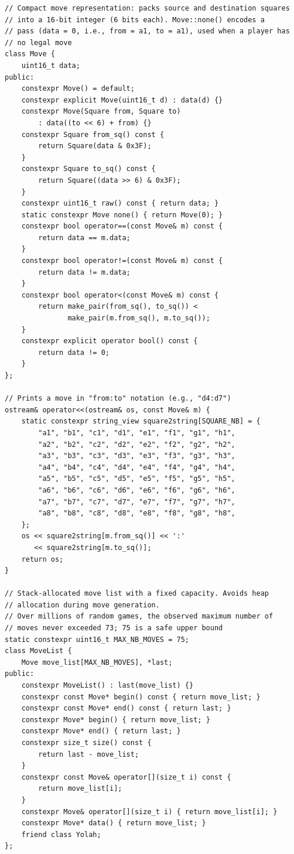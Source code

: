 \documentclass[12pt,a4paper,twoside,openright]{book}
\begin{document}
\begin{mdframed}[skipabove=\baselineskip,topline=false,rightline=false,bottomline=false,leftline=false,linewidth=1pt,linecolor=gray!40,innerleftmargin=8pt]
\begin{verbatim}
// Compact move representation: packs source and destination squares 
// into a 16-bit integer (6 bits each). Move::none() encodes a 
// pass (data = 0, i.e., from = a1, to = a1), used when a player has
// no legal move
class Move {
    uint16_t data;
public:
    constexpr Move() = default;
    constexpr explicit Move(uint16_t d) : data(d) {}
    constexpr Move(Square from, Square to)
        : data((to << 6) + from) {}
    constexpr Square from_sq() const {
        return Square(data & 0x3F);
    }
    constexpr Square to_sq() const {
        return Square((data >> 6) & 0x3F);
    }
    constexpr uint16_t raw() const { return data; }
    static constexpr Move none() { return Move(0); }
    constexpr bool operator==(const Move& m) const {
        return data == m.data;
    }
    constexpr bool operator!=(const Move& m) const {
        return data != m.data;
    }
    constexpr bool operator<(const Move& m) const {
        return make_pair(from_sq(), to_sq()) < 
               make_pair(m.from_sq(), m.to_sq());
    }
    constexpr explicit operator bool() const { 
        return data != 0; 
    }
};

// Prints a move in "from:to" notation (e.g., "d4:d7")
ostream& operator<<(ostream& os, const Move& m) {
    static constexpr string_view square2string[SQUARE_NB] = {
        "a1", "b1", "c1", "d1", "e1", "f1", "g1", "h1",
        "a2", "b2", "c2", "d2", "e2", "f2", "g2", "h2",
        "a3", "b3", "c3", "d3", "e3", "f3", "g3", "h3",
        "a4", "b4", "c4", "d4", "e4", "f4", "g4", "h4",
        "a5", "b5", "c5", "d5", "e5", "f5", "g5", "h5",
        "a6", "b6", "c6", "d6", "e6", "f6", "g6", "h6",
        "a7", "b7", "c7", "d7", "e7", "f7", "g7", "h7",
        "a8", "b8", "c8", "d8", "e8", "f8", "g8", "h8",
    };
    os << square2string[m.from_sq()] << ':' 
       << square2string[m.to_sq()];
    return os;
}

// Stack-allocated move list with a fixed capacity. Avoids heap 
// allocation during move generation. 
// Over millions of random games, the observed maximum number of 
// moves never exceeded 73; 75 is a safe upper bound
static constexpr uint16_t MAX_NB_MOVES = 75;
class MoveList {
    Move move_list[MAX_NB_MOVES], *last;
public:
    constexpr MoveList() : last(move_list) {}
    constexpr const Move* begin() const { return move_list; }
    constexpr const Move* end() const { return last; }
    constexpr Move* begin() { return move_list; }
    constexpr Move* end() { return last; }
    constexpr size_t size() const { 
        return last - move_list; 
    }
    constexpr const Move& operator[](size_t i) const { 
        return move_list[i]; 
    }
    constexpr Move& operator[](size_t i) { return move_list[i]; }
    constexpr Move* data() { return move_list; }
    friend class Yolah;
};


\end{verbatim}
\end{mdframed}
\end{document}
